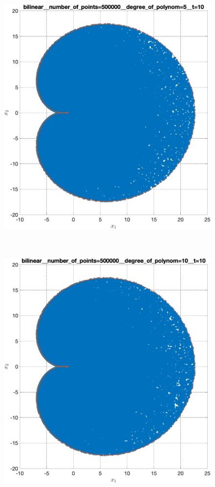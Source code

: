 \documentclass[../main.tex]{subfiles}
\begin{document}
\begin{figure}[ht!]
\begin{minipage}[b]{.3\linewidth}
  		\includegraphics[width=\linewidth]{images/bilinear__number_of_points=500000__degree_of_polynom=5__t=10.eps}
  	\end{minipage} 
  	\hfill
  	\begin{minipage}[b]{.3\linewidth} 
  		\small
  		\centering
  		\includegraphics[width=\linewidth]{images/bilinear__number_of_points=500000__degree_of_polynom=10__t=10.eps}

\end{minipage}
\end{figure}
\end{document}
